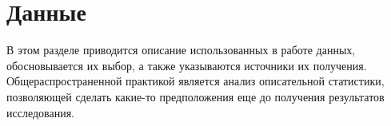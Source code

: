 \section{Данные}
\label{sec:Data}

В этом разделе приводится описание использованных в работе данных, обосновывается их выбор, а также указываются источники их получения. Общераспространенной практикой является анализ описательной статистики, позволяющей сделать какие-то предположения еще до получения результатов исследования.